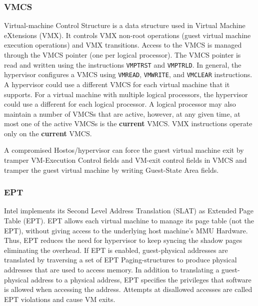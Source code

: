 \subsubsection{VMCS}%
\label{ssub:vmcs}
Virtual-machine Control Structure is a data structure used in Virtual Machine eXtensions (VMX). It controls VMX non-root operations (guest virtual machine execution operations) and VMX transitions. Access to the VMCS is managed through the VMCS pointer (one per logical processor). The VMCS pointer is read and written using the instructions \verb|VMPTRST| and \verb|VMPTRLD|. In general, the hypervisor configures a VMCS using \verb|VMREAD|, \verb|VMWRITE|, and \verb|VMCLEAR| instructions. A hypervisor could use a different VMCS for each virtual machine that it supports. For a virtual machine with multiple logical processors, the hypervisor could use a different for each logical processor. A logical processor may also maintain a number of VMCSs that are active, however, at any given time, at most one of the active VMCSs is the \textbf{current} VMCS. VMX instructions operate only on the \textbf{current} VMCS. 

A compromised Hostos/hypervisor can force the guest virtual machine exit by tramper VM-Execution Control fields and VM-exit control fields in VMCS and tramper the guest virtual machine by writing Guest-State Area fields. 




\subsubsection{EPT}%
\label{ssub:ept}
Intel implements its Second Level Address Translation (SLAT) as Extended Page Table (EPT). 
EPT allows each virtual machine to manage its page table (not the EPT), without giving access to the underlying host machine's MMU Hardware. Thus, EPT reduces the need for hypervisor to keep syncing the shadow pages eliminating the overhead.
If EPT is enabled, guest-physical addresses are translated by traversing a set of EPT Paging-structures to produce physical addresses that are used to access memory.
In addition to translating a guest-physical address to a physical address, EPT specifies the privileges that software is allowed when accessing the address. Attempts at disallowed accesses are called EPT violations and cause VM exits.

